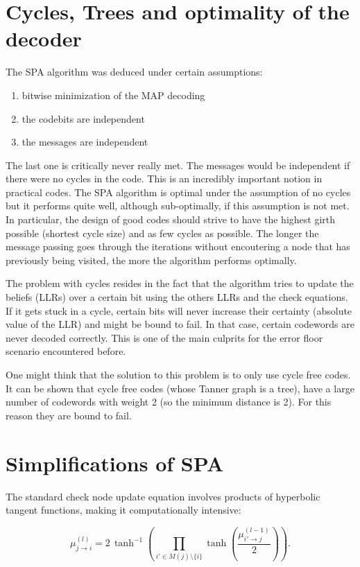 \section{Cycles, Trees and optimality of the decoder}
The SPA algorithm was deduced under certain assumptions:
\begin{enumerate}
	\item bitwise minimization of the MAP decoding
	\item the codebits are independent
	\item the messages are independent
\end{enumerate}

The last one is critically never really met. The messages would be independent if there were no cycles in the code. This is an incredibly important notion in practical codes. The SPA algorithm is optimal under the assumption of no cycles but it performs quite well, although sub-optimally, if this assumption is not met. In particular, the design of good codes should strive to have the highest girth possible (shortest cycle size) and as few cycles as possible. The longer the message passing goes through the iterations without encoutering a node that has previously being visited, the more the algorithm performs optimally. 

The problem with cycles resides in the fact that the algorithm tries to update the beliefs (LLRs) over a certain bit using the others LLRs and the check equations. If it gets stuck in a cycle, certain bits will never increase their certainty (absolute value of the LLR) and might be bound to fail. In that case, certain codewords are never decoded correctly. This is one of the main culprits for the error floor scenario encountered before. 

One might think that the solution to this problem is to only use cycle free codes. It can be shown that cycle free codes (whose Tanner graph is a tree), have a large number of codewords with weight 2 (so the minimum distance is 2). For this reason they are bound to fail. 


\section{Simplifications of SPA}

The standard check node update equation involves products of hyperbolic tangent functions, making it computationally intensive:

\[
\mu_{j \rightarrow i}^{(l)} = 2\,\tanh^{-1}\left(\prod_{i' \in M(j)\setminus\{i\}} \tanh\left(\frac{\mu_{i' \rightarrow j}^{(l-1)}}{2}\right)\right).
\]

